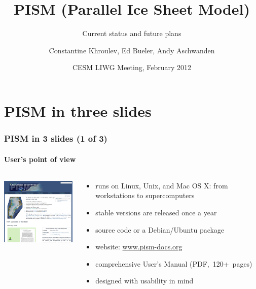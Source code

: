 \documentclass[hide notes,intlimits]{beamer}
\title[] %
{PISM (Parallel Ice Sheet Model)}
\subtitle{Current status and future plans}
\author[Khroulev] %
{Constantine Khroulev, Ed Bueler, Andy Aschwanden}
\institute{
University of Alaska Fairbanks
}
\date{CESM LIWG Meeting, February 2012}
\begin{document}
\AtBeginSection[]{}


{
} 

\begin{frame}
  \titlepage
\end{frame}

{
}

\section{PISM in three slides}

\begin{frame}
  \frametitle{PISM in 3 slides (1 of 3)}
  \framesubtitle{User's point of view}
  \begin{columns}
    \begin{column}{50mm}
      \includegraphics[width=50mm]{pismdocs.png}
    \end{column}
    \begin{column}{70mm}
      \begin{itemize}
      \item runs on Linux, Unix, and Mac OS X: from
        workstations to supercomputers
      \item stable versions are released once a year
      \item source code or a Debian/Ubuntu package
      \item website: \url{www.pism-docs.org}
      \item comprehensive User's Manual \mbox{(PDF, 120+ pages)}
      \item designed with usability in mind
      \end{itemize}
    \end{column}
  \end{columns}
\end{frame}
\end{document}
